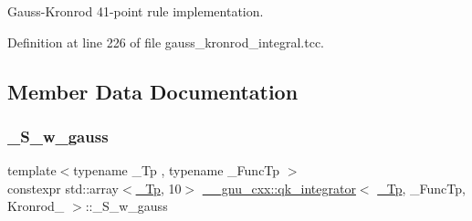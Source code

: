 Gauss-\/\+Kronrod 41-\/point rule implementation. 

Definition at line 226 of file gauss\+\_\+kronrod\+\_\+integral.\+tcc.



\subsection{Member Data Documentation}
\mbox{\label{struct____gnu__cxx_1_1qk__integrator_3_01__Tp_00_01__FuncTp_00_01Kronrod__41_01_4_a8fe39fcd7f3d302de90f987b349bc7a6}} 
\subsubsection{\texorpdfstring{\+\_\+\+S\+\_\+w\+\_\+gauss}{\_S\_w\_gauss}}
{\footnotesize\ttfamily template$<$typename \+\_\+\+Tp , typename \+\_\+\+Func\+Tp $>$ \\
constexpr std\+::array$<$\hyperlink{namespace____gnu__cxx_a3b19a9c800ca194374ef9172290f7d79}{\+\_\+\+Tp}, 10$>$ \hyperlink{class____gnu__cxx_1_1qk__integrator}{\+\_\+\+\_\+gnu\+\_\+cxx\+::qk\+\_\+integrator}$<$ \hyperlink{namespace____gnu__cxx_a3b19a9c800ca194374ef9172290f7d79}{\+\_\+\+Tp}, \+\_\+\+Func\+Tp, Kronrod\+\_ $>$\+::\+\_\+\+S\+\_\+w\+\_\+gauss\hspace{0.3cm}{\ttfamily [static]}}

